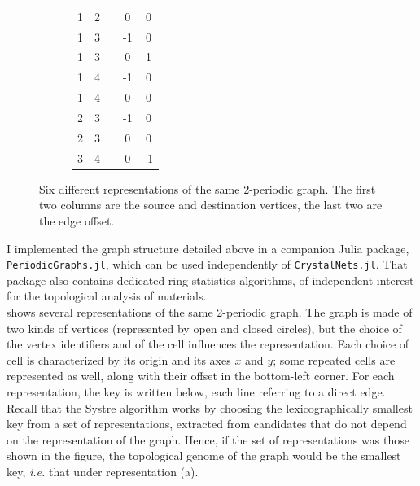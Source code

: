 \documentclass[main.tex]{subfiles}
\begin{document}
\begin{figure}[t]
\begin{subfigure}[b]{0.35\linewidth}
		\centering\scriptsize\begin{tabular}{ccccc}
			1&2&&0&0\\
			1&3&&-1&0\\
			1&3&&0&1\\
			1&4&&-1&0\\
			1&4&&0&0\\
			2&3&&-1&0\\
			2&3&&0&0\\
			3&4&&0&-1
		\end{tabular}
		\vspace{-0.5em}
	\end{subfigure}
	\vspace{2mm}
	\caption{Six different representations of the same 2-periodic graph. The first two columns are the source and destination vertices, the last two are the edge offset.} \label{periodiccells}
\end{figure}

I implemented the graph structure detailed above in a companion Julia package, \texttt{PeriodicGraphs.jl}, which can be used independently of \texttt{CrystalNets.jl}. That package also contains dedicated ring statistics algorithms, of independent interest for the topological analysis of materials.\\

 shows several representations of the same 2-periodic graph. The graph is made of two kinds of vertices (represented by open and closed circles), but the choice of the vertex identifiers and of the cell influences the representation. Each choice of cell is characterized by its origin and its axes $x$ and $y$; some repeated cells are represented as well, along with their offset in the bottom-left corner. For each representation, the key is written below, each line referring to a direct edge. Recall that the Systre algorithm works by choosing the lexicographically smallest key from a set of representations, extracted from candidates that do not depend on the representation of the graph. Hence, if the set of representations was those shown in the figure, the topological genome of the graph would be the smallest key, \textit{i.e.} that under representation {\sffamily(a)}.

\end{document}
